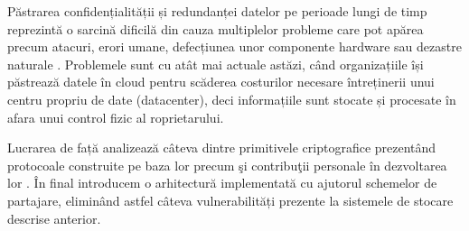 \documentclass[oneside, 12pt]{book}
\begin{document}
\hspace*{5mm}Păstrarea confidențialității și redundanței datelor pe perioade lungi de timp reprezintă o sarcină dificilă din cauza multiplelor probleme care pot apărea precum atacuri, erori umane, defecțiunea unor componente hardware sau dezastre naturale \cite{SGMV:2009}. Problemele sunt cu atât mai actuale astăzi, când organizațiile își păstrează datele în cloud pentru scăderea costurilor necesare întreținerii unui centru propriu de date (datacenter), deci informațiile sunt stocate și procesate în afara unui control fizic al roprietarului.

\hspace*{5mm}Lucrarea de față analizează câteva dintre primitivele criptografice prezentând protocoale construite pe baza lor precum şi contribuţii personale în dezvoltarea lor \cite{RD:2014, RD:2015}. În final introducem o arhitectură implementată cu ajutorul schemelor de partajare, eliminând astfel câteva vulnerabilități prezente la sistemele de stocare descrise anterior.



\setcounter{tocdepth}{2}
\tableofcontents
\end{document}
